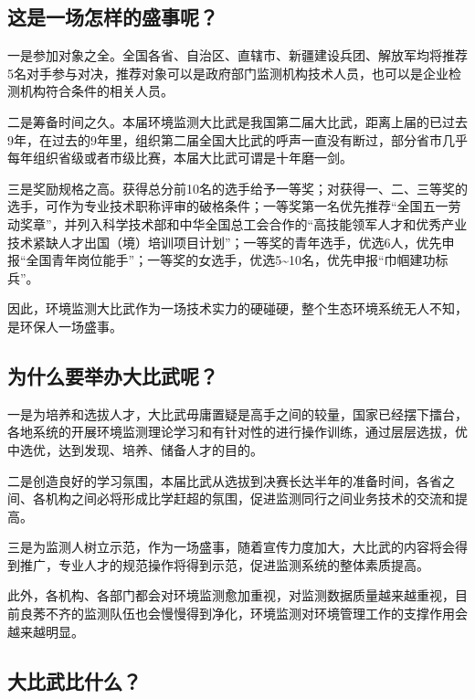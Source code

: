 \documentclass[]{book}
\begin{document}
\hypertarget{ux8fd9ux662fux4e00ux573aux600eux6837ux7684ux76dbux4e8bux5462}{%
\subsection{这是一场怎样的盛事呢？}\label{ux8fd9ux662fux4e00ux573aux600eux6837ux7684ux76dbux4e8bux5462}}

一是参加对象之全。全国各省、自治区、直辖市、新疆建设兵团、解放军均将推荐5名对手参与对决，推荐对象可以是政府部门监测机构技术人员，也可以是企业检测机构符合条件的相关人员。

二是筹备时间之久。本届环境监测大比武是我国第二届大比武，距离上届的已过去9年，在过去的9年里，组织第二届全国大比武的呼声一直没有断过，部分省市几乎每年组织省级或者市级比赛，本届大比武可谓是十年磨一剑。

三是奖励规格之高。获得总分前10名的选手给予一等奖；对获得一、二、三等奖的选手，可作为专业技术职称评审的破格条件；一等奖第一名优先推荐``全国五一劳动奖章''，并列入科学技术部和中华全国总工会合作的``高技能领军人才和优秀产业技术紧缺人才出国（境）培训项目计划''；一等奖的青年选手，优选6人，优先申报``全国青年岗位能手''；一等奖的女选手，优选5\textasciitilde{}10名，优先申报``巾帼建功标兵''。

因此，环境监测大比武作为一场技术实力的硬碰硬，整个生态环境系统无人不知，是环保人一场盛事。

\hypertarget{ux4e3aux4ec0ux4e48ux8981ux4e3eux529eux5927ux6bd4ux6b66ux5462}{%
\subsection{为什么要举办大比武呢？}\label{ux4e3aux4ec0ux4e48ux8981ux4e3eux529eux5927ux6bd4ux6b66ux5462}}

一是为培养和选拔人才，大比武毋庸置疑是高手之间的较量，国家已经摆下擂台，各地系统的开展环境监测理论学习和有针对性的进行操作训练，通过层层选拔，优中选优，达到发现、培养、储备人才的目的。

二是创造良好的学习氛围，本届比武从选拔到决赛长达半年的准备时间，各省之间、各机构之间必将形成比学赶超的氛围，促进监测同行之间业务技术的交流和提高。

三是为监测人树立示范，作为一场盛事，随着宣传力度加大，大比武的内容将会得到推广，专业人才的规范操作将得到示范，促进监测系统的整体素质提高。

此外，各机构、各部门都会对环境监测愈加重视，对监测数据质量越来越重视，目前良莠不齐的监测队伍也会慢慢得到净化，环境监测对环境管理工作的支撑作用会越来越明显。

\hypertarget{ux5927ux6bd4ux6b66ux6bd4ux4ec0ux4e48}{%
\subsection{大比武比什么？}\label{ux5927ux6bd4ux6b66ux6bd4ux4ec0ux4e48}}
\end{document}
